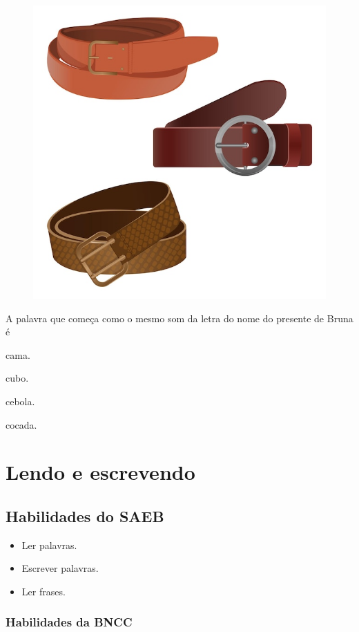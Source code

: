 \begin{figure}[H]
\centering
\includegraphics[width=.5\textwidth]{media/image48.jpeg}
\end{figure}

A palavra que começa como o mesmo som da letra do nome do presente de Bruna é

\begin{escolha}[itemsep=-3pt]
\item cama.

\item cubo.

\item cebola.

\item cocada.
\end{escolha}

\chapter{Lendo e escrevendo}

\vspace*{-1.5cm}

\section*{Habilidades do SAEB}

\begin{itemize}
\item Ler palavras.
\item Escrever palavras.
\item Ler frases.
\end{itemize}

\subsection{Habilidades da BNCC}

